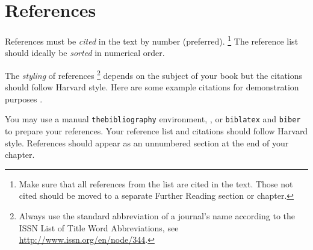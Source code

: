 \documentclass{aip-book}
\newcommand*\cmd[1]{\texttt{#1}} %
\theoremstyle{definition}
\begin{document}
\section{References}

References must be \emph{cited} in the text by number (preferred).%
\footnote{
  Make sure that all references from the list are cited in the text. 
  Those not cited should be moved to a separate Further Reading section or chapter.
}
The reference list should ideally be \emph{sorted} in numerical order. 

The \emph{styling} of references%
\footnote{
  Always use the standard abbreviation of a journal’s name according to the ISSN List of Title Word Abbreviations, see \url{http://www.issn.org/en/node/344}.} 
depends on the subject of your book but the citations should follow Harvard style.
Here are some example citations for demonstration purposes 
\cite{feyn54,Bire82,Beutler1994,Quinn2001}.

You may use a manual \cmd{thebibliography} environment, , or \cmd{biblatex} and \cmd{biber} to prepare your references.
Your reference list and citations should follow Harvard style.
References should appear as an unnumbered section at the end of your chapter.



\end{document}
